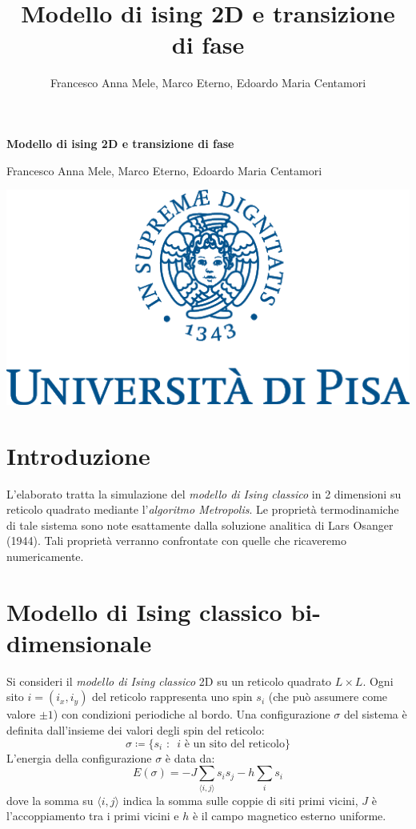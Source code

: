 \documentclass[10pt,a4paper]{article}
\title{Modello di ising 2D e transizione di fase}
\author{Francesco Anna Mele, Marco Eterno, Edoardo Maria Centamori}
\begin{document}
	\begin{titlepage}
		\begin{center}
			
			\vspace{1cm}
			{\LARGE\textbf{ Modello di ising 2D e transizione di fase}\par}
			
			\vspace{0.5cm}
			{\Large Francesco Anna Mele, Marco Eterno, Edoardo Maria Centamori\par}
			
			\vspace{1cm}
			
			\includegraphics[width=0.4\linewidth]{unipi}
	
			
		\end{center}
	\end{titlepage}

\tableofcontents
\newpage
\section{Introduzione}
L'elaborato tratta la simulazione del \emph{modello di Ising classico} in 2 dimensioni su reticolo quadrato mediante l'\emph{algoritmo Metropolis}. Le proprietà termodinamiche di tale sistema sono note esattamente dalla soluzione analitica di Lars Osanger (1944). Tali proprietà verranno confrontate con quelle che ricaveremo numericamente.

\section{Modello di Ising classico bi-dimensionale}

Si consideri il \emph{modello di Ising classico} 2D su un reticolo quadrato $L \times L$. Ogni sito $i=(i_x,i_y)$ del reticolo rappresenta uno spin $s_i$ (che può assumere come valore $\pm 1$) con condizioni periodiche al bordo. Una configurazione $\sigma$ del sistema è definita dall'insieme dei valori degli spin del reticolo:
$$\sigma\coloneqq\{ s_i\text{ :}\text{ } i  \text{ è un sito del reticolo} \}$$
L'energia della configurazione $\sigma$ è data da:
\begin{equation}
E(\sigma)=-J\sum_{\langle i,j\rangle}s_i s_j-h\sum_{i}s_i
\label{eq:energia}
\end{equation}
dove la somma su $\langle i,j \rangle$ indica la somma sulle coppie di siti primi vicini, $J$ è l'accoppiamento tra i primi vicini e $h$ è il campo magnetico esterno uniforme.
\end{document}
